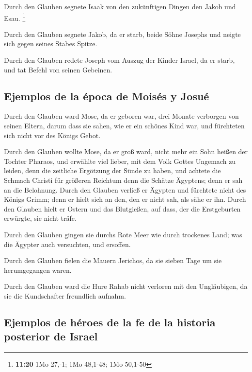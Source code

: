  Durch den Glauben segnete Isaak von den zukünftigen
Dingen den Jakob und Esau. \footnote{\textbf{11:20} 1Mo 27,-1; 1Mo
  48,1-48; 1Mo 50,1-50}

 Durch den Glauben segnete Jakob, da er starb, beide
Söhne Josephs und neigte sich gegen seines Stabes Spitze.

 Durch den Glauben redete Joseph vom Auszug der Kinder
Israel, da er starb, und tat Befehl von seinen Gebeinen.

\hypertarget{ejemplos-de-la-uxe9poca-de-moisuxe9s-y-josuuxe9}{%
\subsection{Ejemplos de la época de Moisés y
Josué}\label{ejemplos-de-la-uxe9poca-de-moisuxe9s-y-josuuxe9}}

 Durch den Glauben ward Mose, da er geboren war, drei
Monate verborgen von seinen Eltern, darum dass sie sahen, wie er ein
schönes Kind war, und fürchteten sich nicht vor des Königs Gebot.

 Durch den Glauben wollte Mose, da er groß ward, nicht
mehr ein Sohn heißen der Tochter Pharaos,  und erwählte
viel lieber, mit dem Volk Gottes Ungemach zu leiden, denn die zeitliche
Ergötzung der Sünde zu haben,  und achtete die Schmach
Christi für größeren Reichtum denn die Schätze Ägyptens; denn er sah an
die Belohnung.  Durch den Glauben verließ er Ägypten und
fürchtete nicht des Königs Grimm; denn er hielt sich an den, den er
nicht sah, als sähe er ihn.  Durch den Glauben hielt er
Ostern und das Blutgießen, auf dass, der die Erstgeburten erwürgte, sie
nicht träfe.

 Durch den Glauben gingen sie durchs Rote Meer wie durch
trockenes Land; was die Ägypter auch versuchten, und ersoffen.

 Durch den Glauben fielen die Mauern Jerichos, da sie
sieben Tage um sie herumgegangen waren.

 Durch den Glauben ward die Hure Rahab nicht verloren mit
den Ungläubigen, da sie die Kundschafter freundlich aufnahm.

\hypertarget{ejemplos-de-huxe9roes-de-la-fe-de-la-historia-posterior-de-israel}{%
\subsection{Ejemplos de héroes de la fe de la historia posterior de
Israel}\label{ejemplos-de-huxe9roes-de-la-fe-de-la-historia-posterior-de-israel}}

